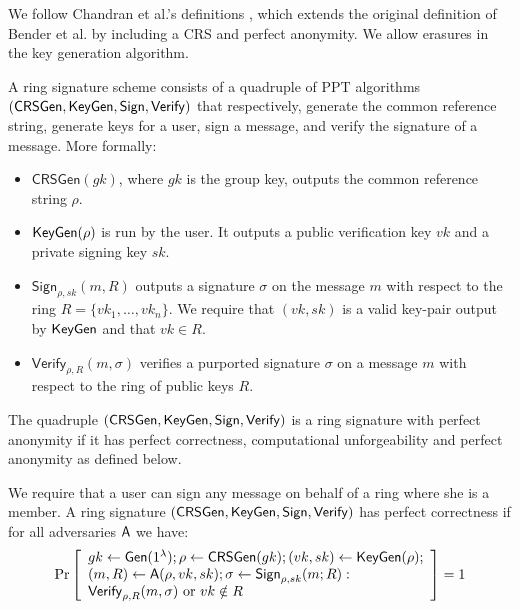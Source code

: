 We follow Chandran et al.'s definitions \cite{ICALP:ChaGroSah07}, which extends the original definition of Bender et al. \cite{TCC:BenKatMor06} by including a CRS and perfect anonymity. We allow erasures in the key generation algorithm.

\begin{definition}
A ring signature scheme consists of a quadruple of
PPT algorithms $(\mathsf{CRSGen}, \mathsf{KeyGen}, \mathsf{Sign}, \mathsf{Verify})$ that respectively, generate the common
reference string, generate keys for a user, sign a message, and verify the signature of a
message. More formally:
\begin{itemize}
\item $\mathsf{CRSGen}(gk)$, where $gk$ is the group key, outputs the common reference
string $\rho$.
\item $\mathsf{KeyGen}(\rho)$ is run by the user. It outputs a public verification key $vk$ and a private
signing key $sk$.
\item $\mathsf{Sign}_{\rho,sk}(m, R)$ outputs a signature $\sigma$ on the message $m$ with respect to the ring
$R = \{vk_1,\ldots,vk_n\}$. We require that $(vk, sk)$ is a valid key-pair output by $\mathsf{KeyGen}$
and that $vk \in R$.
\item $\mathsf{Verify}_{\rho,R}(m, \sigma)$ verifies a purported signature $\sigma$ on a message $m$ with respect to
the ring of public keys $R$.
\end{itemize}
The quadruple $(\mathsf{CRSGen}, \mathsf{KeyGen}, \mathsf{Sign}, \mathsf{Verify})$ is a ring signature with perfect
anonymity if it has perfect correctness, computational unforgeability and perfect
anonymity as defined below.
\end{definition}

\begin{definition}
We require that a user can sign any message on behalf of a ring where she is a member. A ring signature $(\mathsf{CRSGen},\allowbreak \mathsf{KeyGen}, \mathsf{Sign}, \mathsf{Verify})$
has perfect correctness if for all adversaries $\mathsf{A}$ we have:
$$
\Pr\left[\begin{array}{l}
gk\gets\mathsf{Gen}(1^\lambda);\rho\gets\mathsf{CRSGen}(gk);(vk,sk)\gets\mathsf{KeyGen}(\rho);\\
(m,R)\gets\mathsf{A}(\rho,vk,sk);\sigma\gets\mathsf{Sign}_{\rho,sk}(m;R):\\
\mathsf{Verify}_{\rho,R}(m,\sigma)\text{ or }vk\notin R
\end{array}\right]=1
$$
\end{definition}


